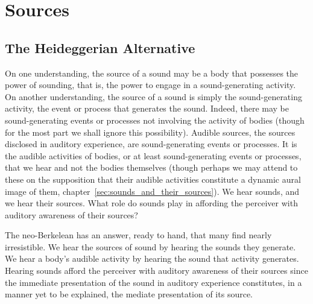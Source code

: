 \chapter{Sources} %
\label{cha:sources_of_sound}

\section{The Heideggerian Alternative} %
\label{sec:the_heideggerian_alternative}

On one understanding, the source of a sound may be a body that possesses the power of sounding, that is, the power to engage in a sound-generating activity. On another understanding, the source of a sound is simply the sound-generating activity, the event or process that generates the sound. Indeed, there may be sound-generating events or processes not involving the activity of bodies (though for the most part we shall ignore this possibility). Audible sources, the sources disclosed in auditory experience, are sound-generating events or processes. It is the audible activities of bodies, or at least sound-generating events or processes, that we hear and not the bodies themselves (though perhaps we may attend to these on the supposition that their audible activities constitute a dynamic aural image of them, chapter~\ref{sec:sounds_and_their_sources}). We hear sounds, and we hear their sources. What role do sounds play in affording the perceiver with auditory awareness of their sources?

The neo-Berkelean has an answer, ready to hand, that many find nearly irresistible. We hear the sources of sound by hearing the sounds they generate. We hear a body's audible activity by hearing the sound that activity generates. Hearing sounds afford the perceiver with auditory awareness of their sources since the immediate presentation of the sound in auditory experience constitutes, in a manner yet to be explained, the mediate presentation of its source.

